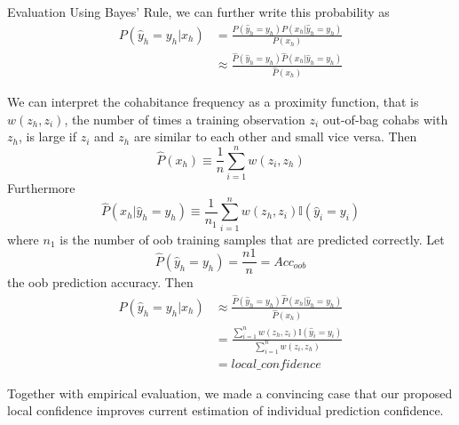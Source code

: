 \documentclass[12pt]{pom_thesis}
\begin{document}
\begin{chapter}{Evaluation}
Using Bayes' Rule, we can further write this probability as 
\begin{equation} \label{eq1}
\begin{split}
P(\hat{y}_h=y_h|x_h) &= \frac{P(\hat{y}_h=y_h)P(x_h|\hat{y}_h=y_h)}{P(x_h)} \\
  & \approx \frac{\hat{P}(\hat{y}_h=y_h)\hat{P}(x_h|\hat{y}_h=y_h)}{\hat{P}(x_h)}
\end{split}
\end{equation}

We can interpret the cohabitance frequency as a proximity function, that is $w(z_h,z_i)$, the number of times a training observation $z_i$ out-of-bag cohabs with $z_h$, is large if $z_i$ and $z_h$ are similar to each other and small vice versa. Then 
\begin{equation}
    \hat{P}(x_h) \equiv \frac{1}{n} \sum_{i=1}^n  w(z_i,z_h)
\end{equation}
Furthermore
\begin{equation}
  \hat{P}(x_h|\hat{y}_h=y_h) \equiv \frac{1}{n_1}\sum_{i=1}^n w(z_h,z_i)\mathbb{I}(\hat{y}_i=y_i) 
\end{equation}
where $n_1$ is the number of oob training samples that are predicted correctly. 
Let 
\begin{equation}
   \hat{P}(\hat{y}_h=y_h) = \frac{n1}{n} = Acc_{oob} 
\end{equation}
the oob prediction accuracy. Then 
\begin{equation} \label{eq2}
\begin{split}
P(\hat{y}_h=y_h|x_h) 
  & \approx \frac{\hat{P}(\hat{y}_h=y_h)\hat{P}(x_h|\hat{y}_h=y_h)}{\hat{P}(x_h)} \\
  & = \frac{\sum_{i=1}^n w(z_h,z_i)\mathbb{I}(\hat{y}_i=y_i) }{ \sum_{i=1}^n  w(z_i,z_h)} \\
  & = local\_confidence
\end{split}
\end{equation}

Together with empirical evaluation, we made a convincing case that our proposed local confidence improves current estimation of individual prediction confidence. 
\end{chapter}
\end{document}
